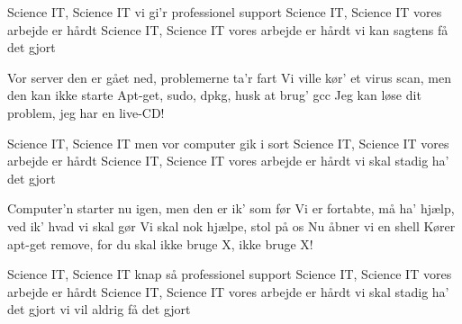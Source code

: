 \documentclass[a4paper,11pt]{article}
\begin{document}
\begin{song}

 Science IT, Science IT
 vi gi'r professionel support
 Science IT, Science IT
vores arbejde er hårdt
Science IT, Science IT
vores arbejde er hårdt
vi kan sagtens få det gjort
               
 Vor server den er gået ned,
problemerne ta'r fart
 Vi ville kør' et virus scan,
men den kan ikke starte
 Apt-get, sudo, dpkg,
husk at brug' gcc
 Jeg kan løse dit problem,
 jeg har en live-CD!

 Science IT, Science IT
 men vor computer gik i sort
 Science IT, Science IT
vores arbejde er hårdt
Science IT, Science IT
vores arbejde er hårdt
vi skal stadig ha' det gjort

 Computer'n starter nu igen,
men den er ik' som før
 Vi er fortabte, må ha' hjælp,
ved ik' hvad vi skal gør
 Vi skal nok hjælpe, stol på os
Nu åbner vi en shell
 Kører apt-get remove, for du skal
ikke bruge X, 
ikke bruge X!

 Science IT, Science IT
 knap så professionel support
 Science IT, Science IT
vores arbejde er hårdt
Science IT, Science IT
vores arbejde er hårdt
vi skal stadig ha' det gjort
vi vil aldrig få det gjort

\end{song}
\end{document}
